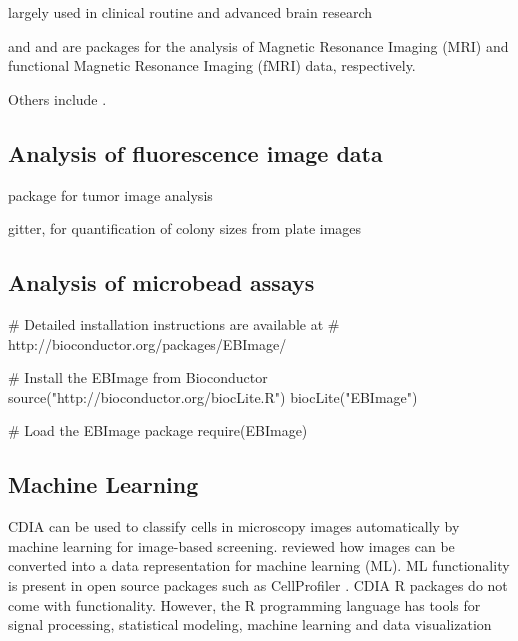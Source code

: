 largely used in clinical routine and advanced brain research

 \citep{bordier_temporal_2011, marchini_analyzefmri:_2002} and  
\citep{polzehl_fmri:_2007} and are packages for the analysis of Magnetic 
Resonance Imaging (MRI) and functional Magnetic Resonance Imaging (fMRI) data, 
respectively.

 \citep{philipsen_pet:_2010}

Others include  \citep{dunning_beadarray:_2006, frery_introduction_2013}.

\subsection{Analysis of fluorescence image data}

 package \citep{failmezger_crimage:_2012} for tumor image analysis


gitter, for quantification of colony sizes from plate images \citep{wagih_gitter:_2014}


\subsection{Analysis of microbead assays}

\citep{rodiger_highly_2013, rodiger_nucleic_2014}

\begin{example}
# Detailed installation instructions are available at 
# http://bioconductor.org/packages/EBImage/

# Install the EBImage from Bioconductor
source("http://bioconductor.org/biocLite.R")
biocLite("EBImage")

# Load the EBImage package
require(EBImage)


\end{example}

\subsection{Machine Learning}
CDIA can be used to classify cells in microscopy images automatically by machine 
learning for image-based screening. \citet{sommer_machine_2013} reviewed how 
images can be converted into a data representation for machine learning (ML). ML 
functionality is present in open source packages such as CellProfiler 
\citep{conrad_micropilot:_2011, sommer_machine_2013}. CDIA R packages do not 
come with functionality. However, the R programming language has tools for 
signal processing, statistical modeling, machine learning and data visualization 
\citep{abbas_comparative_2014, fuchs_clustering_2010, pau_ebimager_2010}

